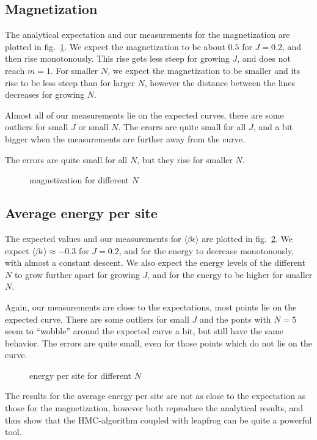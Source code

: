 \documentclass{scrartcl}
\begin{document}
\subsection{Magnetization}

The analytical expectation and our measurements for the magnetization are plotted in fig.~\ref{fig:magnetization}. We expect the magnetization to be about $0.5$ for $J=0.2$, and then rise monotonously. This rise gets less steep for growing $J$, and does not reach $m=1$. For smaller $N$, we expect the magnetization to be smaller and its rise to be less steep than for larger $N$, however the distance between the lines decreases for growing $N$.

Almost all of our measurements lie on the expected curves, there are some outliers for small $J$ or small $N$. The erorrs are quite small for all $J$, and a bit bigger when the measurements are further away from the curve.

The errors are quite small for all $N$, but they rise for smaller $N$.
\begin{figure}[htbp]
	
	\caption{magnetization for different $N$}
	\label{fig:magnetization}
\end{figure}

\subsection{Average energy per site}

The expected values and our measurements for $\langle \beta\epsilon\rangle$ are plotted in fig.~\ref{fig:energy}. We expect $\langle \beta\epsilon\rangle\approx-0.3$ for $J=0.2$, and for the energy to decrease monotonously, with almost a constant descent. We also expect the energy levels of the different $N$ to grow further apart for growing $J$, and for the energy to be higher for smaller $N$.

Again, our measurements are close to the expectations, most points lie on the expected curve. There are some outliers for small $J$ and the ponts with $N=5$ seem to \enquote{wobble} around the expected curve a bit, but still have the same behavior.
The errors are quite small, even for those points which do not lie on the curve.
  
\begin{figure}[htbp]
	
	\caption{energy per site for different $N$}
	\label{fig:energy}
\end{figure}

The results for the average energy per site are not as close to the expectation as those for the magnetization, however both reproduce the analytical results, and thus show that the HMC-algorithm coupled with leapfrog can be quite a powerful tool.

\newpage	
\listoffigures
\printbibliography
\end{document}
